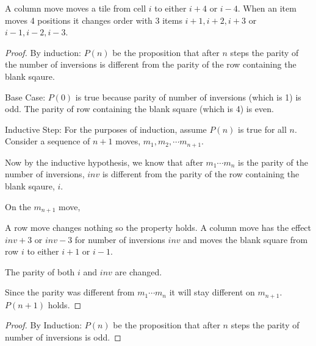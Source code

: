\documentclass[titlepage,12pt]{book}
\begin{document}
\begin{solution}
{        \begin{lemm}
            A column move moves a tile from cell $i$ to either $i + 4$ or $i - 4$.
        When an item moves 4 positions it changes order with 3 items $i + 1, i + 2, i + 3$ or $i - 1, i - 2, i - 3$.
        \end{lemm}

        \begin{proof}
            By induction:
            $P(n)$ be the proposition that after $n$ steps the parity of
            the number of inversions is different from the parity of the
            row containing the blank sqaure.

            Base Case: $P(0)$ is true because parity of number of inversions (which is 1) is odd.
            The parity of row containing the blank square (which is 4) is even.

            Inductive Step: For the purposes of induction, assume $P(n)$ is true for all $n$.
            Consider a sequence of $n + 1$ moves, $m_{1}, m_{2}, \cdots m_{n + 1}$.

            Now by the inductive hypothesis, we know that
            after $m_{1} \cdots m_{n}$ is the parity of
            the number of inversions, $inv$ is different from the parity of the
            row containing the blank sqaure, $i$.


            On the $m_{n + 1}$ move,
            
            A row move changes nothing so the property holds.
            A column move has the effect $inv + 3$ or $inv - 3$ for number of inversions $inv$
            and moves the blank square from row $i$ to either $i + 1$ or $i - 1$.
            
            The parity of both $i$ and $inv$ are changed.

            Since the parity was different from $m_{1} \cdots m_{n}$ it will stay different on $m_{n + 1}$.
            $P(n + 1)$ holds.
        \end{proof}
        \item
        \begin{proof}
            By Induction:
            $P(n)$ be the proposition that after $n$ steps the parity of
            number of inversions is odd.


\end{proof}}
\end{solution}
\end{document}
